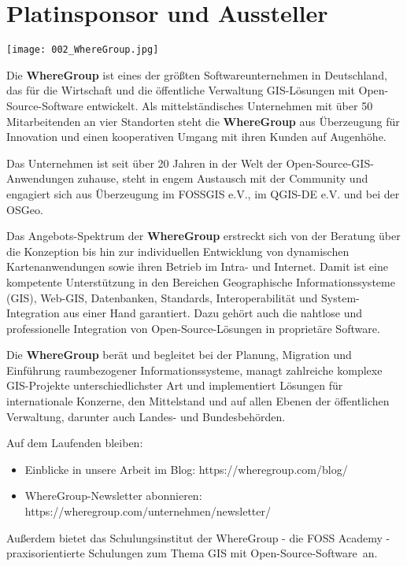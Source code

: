 \section*{Platinsponsor und Aussteller}
\begin{center}
  \centerline{\texttt{[image: 002\_WhereGroup.jpg]}}
\end{center}
\vspace*{-0.6cm}

{\footnotesize
\noindent
Die {\bfseries WhereGroup} ist eines der größten Softwareunternehmen in Deutschland, das für die Wirtschaft und die öffentliche Verwaltung GIS-Lösungen mit Open-Source-Software entwickelt. Als mittelständisches Unternehmen mit über 50 Mitarbeitenden an vier Standorten steht die {\bfseries WhereGroup} aus Überzeugung für Innovation und einen kooperativen Umgang mit ihren Kunden auf Augenhöhe.

\noindent
Das Unternehmen ist seit über 20 Jahren in der Welt der Open-Source-GIS-Anwendun\-gen zuhause, steht in engem Austausch mit der Community und engagiert sich aus Überzeugung im FOSSGIS e.V., im QGIS-DE e.V. und bei der OSGeo.

\noindent
Das Angebots-Spektrum der {\bfseries WhereGroup} erstreckt sich von der Beratung über die Konzeption bis hin zur individuellen Entwicklung von dynamischen Kartenanwendungen sowie ihren Betrieb im Intra- und Internet. Damit ist eine kompetente Unterstützung in den Bereichen Geographische Informationssysteme (GIS), Web-GIS, Datenbanken, Standards, Interoperabilität und System-Integration aus einer Hand garantiert. Dazu gehört auch die nahtlose und professionelle Integration von Open-Source-Lösungen in proprietäre Software.

\noindent
Die {\bfseries WhereGroup} berät und begleitet bei der Planung, Migration und Einführung raumbezogener Informationssysteme, managt zahlreiche komplexe GIS-Projekte unterschiedlichster Art und implementiert Lösungen für internationale Konzerne, den Mittelstand und auf allen Ebenen der öffentlichen Verwaltung, darunter auch Landes- und Bundesbehörden.

\noindent
Auf dem Laufenden bleiben:
\begin{itemize}
\item Einblicke in unsere Arbeit im Blog: https://wheregroup.com/blog/
\item  WhereGroup-Newsletter abonnieren: https://wheregroup.com/unternehmen/newsletter/
 \end{itemize}
\noindent
Außerdem bietet das Schulungsinstitut der WhereGroup - die FOSS Academy -\linebreak
praxisorientierte Schulungen zum Thema \glqq GIS mit Open-Source-Software\grqq\  an.
}
